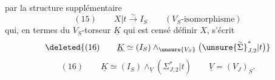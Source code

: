  par la  structure supplémentaire
\[
(15)\qquad X|t\xrightarrow{\sim}I_S\qquad(V_S\text{-isomorphisme})
\]
qui, en termes du $V_S$-torseur $\underline K$ qui est censé définir $X$, s'écrit
\[
\deleted{(16)\qquad\underline K\simeq(I_S)\wedge_{\unsure{V_S}}\bigl(\unsure{\widetilde\Sigma}_{J,2}^*|t\bigr)}
\]
\[
(16)\qquad\underline K\simeq(I_S)\wedge_{\underline V}(\Sigma_{J,2}^*|t)
\qquad\underline V=(V_J)_S.
\]
